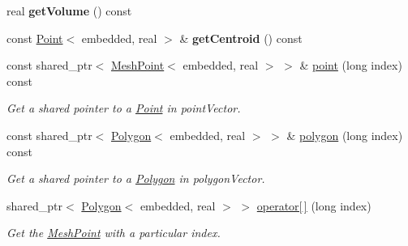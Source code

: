 \begin{DoxyCompactItemize}
\item 
real {\bfseries get\+Volume} () const \hypertarget{class_polyhedron_a5fb0dbbf7e0ff2673719623326fb15de}{}\label{class_polyhedron_a5fb0dbbf7e0ff2673719623326fb15de}

\item 
const \hyperlink{class_point}{Point}$<$ embedded, real $>$ \& {\bfseries get\+Centroid} () const \hypertarget{class_polyhedron_a216ab5fbf3fd23a9112a3e1d16ec899d}{}\label{class_polyhedron_a216ab5fbf3fd23a9112a3e1d16ec899d}

\item 
const shared\+\_\+ptr$<$ \hyperlink{class_mesh_point}{Mesh\+Point}$<$ embedded, real $>$ $>$ \& \hyperlink{class_polyhedron_a85926d30dec42f3d8d1c6b5af8a282d3}{point} (long index) const \hypertarget{class_polyhedron_a85926d30dec42f3d8d1c6b5af8a282d3}{}\label{class_polyhedron_a85926d30dec42f3d8d1c6b5af8a282d3}

\begin{DoxyCompactList}\small\item\em Get a shared pointer to a \hyperlink{class_point}{Point} in point\+Vector. \end{DoxyCompactList}\item 
const shared\+\_\+ptr$<$ \hyperlink{class_polygon}{Polygon}$<$ embedded, real $>$ $>$ \& \hyperlink{class_polyhedron_a8aaba4f1c62f24691648ca66419c83fb}{polygon} (long index) const \hypertarget{class_polyhedron_a8aaba4f1c62f24691648ca66419c83fb}{}\label{class_polyhedron_a8aaba4f1c62f24691648ca66419c83fb}

\begin{DoxyCompactList}\small\item\em Get a shared pointer to a \hyperlink{class_polygon}{Polygon} in polygon\+Vector. \end{DoxyCompactList}\item 
shared\+\_\+ptr$<$ \hyperlink{class_polygon}{Polygon}$<$ embedded, real $>$ $>$ \hyperlink{class_polyhedron_a315560a1e132c15d06692a91a6ed69b5}{operator\mbox{[}$\,$\mbox{]}} (long index)\hypertarget{class_polyhedron_a315560a1e132c15d06692a91a6ed69b5}{}\label{class_polyhedron_a315560a1e132c15d06692a91a6ed69b5}

\begin{DoxyCompactList}\small\item\em Get the \hyperlink{class_mesh_point}{Mesh\+Point} with a particular index. \end{DoxyCompactList}\end{DoxyCompactItemize}
